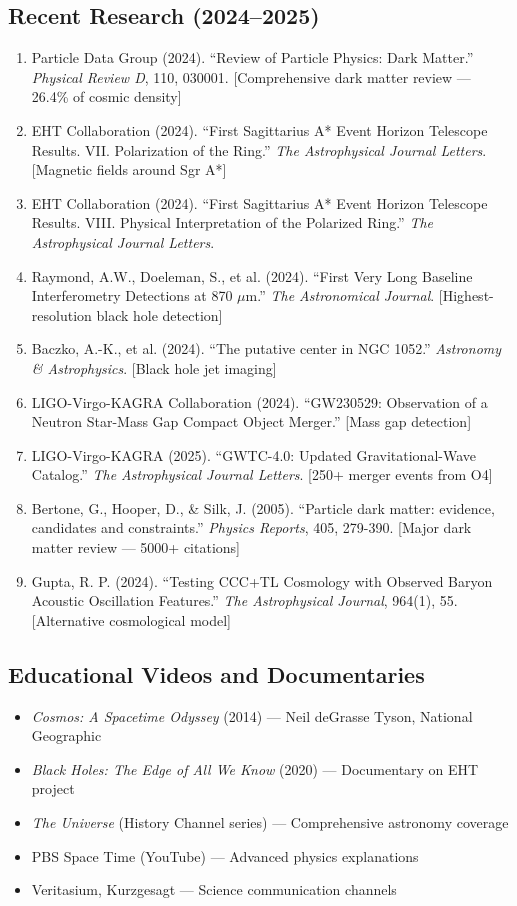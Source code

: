 \documentclass[11pt,a4paper]{article}
\begin{document}
\subsection{Recent Research (2024--2025)}
\begin{enumerate}[noitemsep]
    \item Particle Data Group (2024). ``Review of Particle Physics: Dark Matter.'' \textit{Physical Review D}, 110, 030001. [Comprehensive dark matter review --- 26.4\% of cosmic density]
    \item EHT Collaboration (2024). ``First Sagittarius A* Event Horizon Telescope Results. VII. Polarization of the Ring.'' \textit{The Astrophysical Journal Letters}. [Magnetic fields around Sgr A*]
    \item EHT Collaboration (2024). ``First Sagittarius A* Event Horizon Telescope Results. VIII. Physical Interpretation of the Polarized Ring.'' \textit{The Astrophysical Journal Letters}.
    \item Raymond, A.W., Doeleman, S., et al. (2024). ``First Very Long Baseline Interferometry Detections at 870 $\mu$m.'' \textit{The Astronomical Journal}. [Highest-resolution black hole detection]
    \item Baczko, A.-K., et al. (2024). ``The putative center in NGC 1052.'' \textit{Astronomy \& Astrophysics}. [Black hole jet imaging]
    \item LIGO-Virgo-KAGRA Collaboration (2024). ``GW230529: Observation of a Neutron Star-Mass Gap Compact Object Merger.'' [Mass gap detection]
    \item LIGO-Virgo-KAGRA (2025). ``GWTC-4.0: Updated Gravitational-Wave Catalog.'' \textit{The Astrophysical Journal Letters}. [250+ merger events from O4]
    \item Bertone, G., Hooper, D., \& Silk, J. (2005). ``Particle dark matter: evidence, candidates and constraints.'' \textit{Physics Reports}, 405, 279-390. [Major dark matter review --- 5000+ citations]
    \item Gupta, R. P. (2024). ``Testing CCC+TL Cosmology with Observed Baryon Acoustic Oscillation Features.'' \textit{The Astrophysical Journal}, 964(1), 55. [Alternative cosmological model]
\end{enumerate}

\subsection{Educational Videos and Documentaries}
\begin{itemize}[noitemsep]
    \item \textit{Cosmos: A Spacetime Odyssey} (2014) --- Neil deGrasse Tyson, National Geographic
    \item \textit{Black Holes: The Edge of All We Know} (2020) --- Documentary on EHT project
    \item \textit{The Universe} (History Channel series) --- Comprehensive astronomy coverage
    \item PBS Space Time (YouTube) --- Advanced physics explanations
    \item Veritasium, Kurzgesagt --- Science communication channels
\end{itemize}
\end{document}
